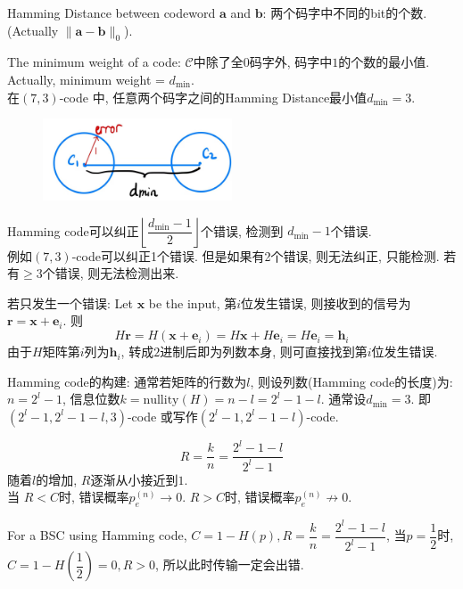 \begin{definition}
Hamming Distance between codeword $\mathbf{a}$ and $\mathbf{b}$: 两个码字中不同的bit的个数. (Actually $\|\mathbf{a}-\mathbf{b}\|_0$).
\end{definition}
The minimum weight of a code: $\mathcal{C}$中除了全0码字外, 码字中$1$的个数的最小值. Actually, minimum weight = $d_{\min}$. \\
在$(7,3)$-code 中, 任意两个码字之间的Hamming Distance最小值$d_{\min}=3$.
\begin{figure}[htbp]
    \centering
    \includegraphics[width=0.5\textwidth]{./figures/chapter5/error.png}
\end{figure}

Hamming code可以纠正$\left\lfloor \dfrac{d_{\min}-1}{2} \right\rfloor$个错误, 检测到 $d_{\min}-1$个错误. \\
例如$(7,3)$-code可以纠正1个错误. 但是如果有2个错误, 则无法纠正, 只能检测. 若有$\geq 3$个错误, 则无法检测出来.

\begin{example}
若只发生一个错误: Let $\mathbf{x}$ be the input, 第$i$位发生错误, 则接收到的信号为 $\mathbf{r}=\mathbf{x}+\mathbf{e}_i$.
则
$$H\mathbf{r}=H(\mathbf{x}+\mathbf{e}_i)=H\mathbf{x}+H\mathbf{e}_i=H\mathbf{e}_i=\mathbf{h}_i$$
由于$H$矩阵第$i$列为$\mathbf{h}_i$, 转成$2$进制后即为列数本身, 则可直接找到第$i$位发生错误.
\end{example}

\begin{proposition}
Hamming code的构建: 通常若矩阵的行数为$l$, 则设列数(Hamming code的长度)为: $n=2^l-1$, 信息位数$k=\text{nullity}(H)=n-l=2^l-1-l$. 通常设$d_{\min}=3$. 即$(2^l-1,2^l-1-l,3)$-code 或写作$(2^l-1,2^l-1-l)$-code.
\end{proposition}
$$R=\dfrac{k}{n}=\dfrac{2^l-1-l}{2^l-1}$$
随着$l$的增加, $R$逐渐从小接近到$1$. \\
当 $R<C$时, 错误概率$p_e^{(n)}\to 0$. $R>C$时, 错误概率$p_e^{(n)}\not\to 0$.
\begin{example}
For a BSC using Hamming code, $C=1-H(p), R = \dfrac{k}{n} = \dfrac{2^l-1-l}{2^l-1}$, 当$p=\dfrac{1}{2}$时, $C=1-H(\dfrac{1}{2})=0, R>0$, 所以此时传输一定会出错. \\
\end{example}

